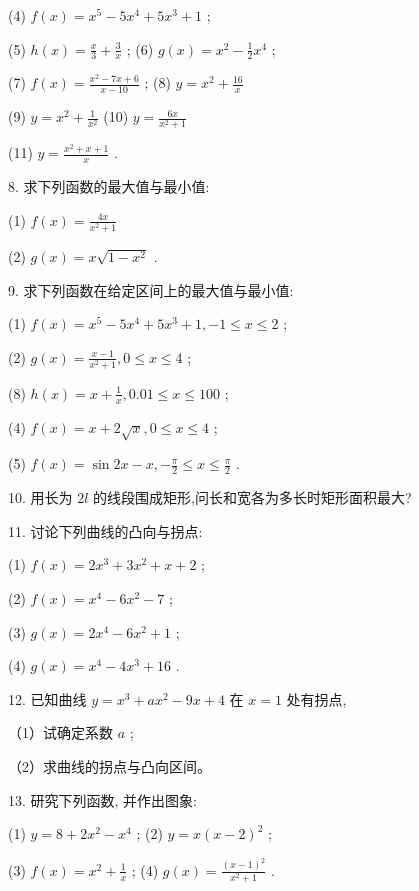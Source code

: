 \documentclass[lang=cn,newtx,10pt,scheme=chinese]{elegantbook}
\begin{document}
(4) \(f\left( x\right) = {x}^{5} - 5{x}^{4} + 5{x}^{3} + 1\) ;

(5) \(h\left( x\right) = \frac{x}{3} + \frac{3}{x}\) ; (6) \(g\left( x\right) = {x}^{2} - \frac{1}{2}{x}^{4}\) ;

(7) \(f\left( x\right) = \frac{{x}^{2} - {7x} + 6}{x - {10}}\) ; (8) \(y = {x}^{2} + \frac{16}{x}\)

(9) \(y = {x}^{2} + \frac{1}{{x}^{2}}\) (10) \(y = \frac{6x}{{x}^{2} + 1}\)

(11) \(y = \frac{{x}^{2} + x + 1}{x}\) .

8. 求下列函数的最大值与最小值:

(1) \(f\left( x\right) = \frac{4x}{{x}^{2} + 1}\)

(2) \(g\left( x\right) = x\sqrt{1 - {x}^{2}}\) .

9. 求下列函数在给定区间上的最大值与最小值:

(1) \(f\left( x\right) = {x}^{5} - 5{x}^{4} + 5{x}^{3} + 1, - 1 \leq x \leq 2\) ;

(2) \(g\left( x\right) = \frac{x - 1}{{x}^{2} + 1},0 \leq x \leq 4\) ;

(8) \(h\left( x\right) = x + \frac{1}{x},{0.01} \leq x \leq {100}\) ;

(4) \(f\left( x\right) = x + 2\sqrt{x},0 \leq x \leq 4\) ;

(5) \(f\left( x\right) = \sin {2x} - x, - \frac{\pi }{2} \leq x \leq \frac{\pi }{2}\) .

10. 用长为 \({2l}\) 的线段围成矩形,问长和宽各为多长时矩形面积最大?

11. 讨论下列曲线的凸向与拐点:

(1) \(f\left( x\right) = 2{x}^{3} + 3{x}^{2} + x + 2\) ;

(2) \(f\left( x\right) = {x}^{4} - 6{x}^{2} - 7\) ;

(3) \(g\left( x\right) = 2{x}^{4} - 6{x}^{2} + 1\) ;

(4) \(g\left( x\right) = {x}^{4} - 4{x}^{3} + {16}\) .

12. 已知曲线 \(y = {x}^{3} + a{x}^{2} - {9x} + 4\) 在 \(x = 1\) 处有拐点,

（1）试确定系数 \(a\) ;

（2）求曲线的拐点与凸向区间。

13. 研究下列函数, 并作出图象:

(1) \(y = 8 + 2{x}^{2} - {x}^{4}\) ; (2) \(y = x{\left( x - 2\right) }^{2}\) ;

(3) \(f\left( x\right) = {x}^{2} + \frac{1}{x}\) ; (4) \(g\left( x\right) = \frac{{\left( x - 1\right) }^{2}}{{x}^{2} + 1}\) .
\end{document}
